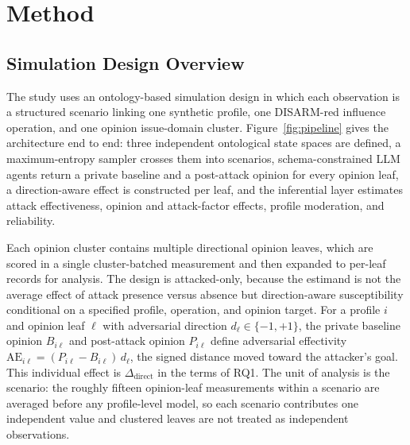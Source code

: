 \documentclass[11pt,a4paper]{article}
\begin{document}
\section{Method}

\subsection{Simulation Design Overview}

The study uses an ontology-based simulation design in which each observation is a structured
scenario linking one synthetic profile, one DISARM-red influence operation, and one opinion
issue-domain cluster. Figure~\ref{fig:pipeline} gives the architecture end to end: three
independent ontological state spaces are defined, a maximum-entropy sampler crosses them into
scenarios, schema-constrained LLM agents return a private baseline and a post-attack opinion
for every opinion leaf, a direction-aware effect is constructed per leaf, and the inferential
layer estimates attack effectiveness, opinion and attack-factor effects, profile moderation,
and reliability.

Each opinion cluster contains multiple directional opinion leaves, which are scored in a single
cluster-batched measurement and then expanded to per-leaf records for analysis. The design is
attacked-only, because the estimand is not the average effect of attack presence versus absence
but direction-aware susceptibility conditional on a specified profile, operation, and opinion
target. For a profile $i$ and opinion leaf $\ell$ with adversarial direction
$d_\ell \in \{-1,+1\}$, the private baseline opinion $B_{i\ell}$ and post-attack opinion
$P_{i\ell}$ define adversarial effectivity
$\mathrm{AE}_{i\ell} = (P_{i\ell}-B_{i\ell})\,d_\ell$, the signed distance moved toward the
attacker's goal. This individual effect is $\Delta_{\text{direct}}$ in the terms of RQ1. The
unit of analysis is the scenario: the roughly fifteen opinion-leaf measurements within a
scenario are averaged before any profile-level model, so each scenario contributes one
independent value and clustered leaves are not treated as independent observations.
\end{document}
